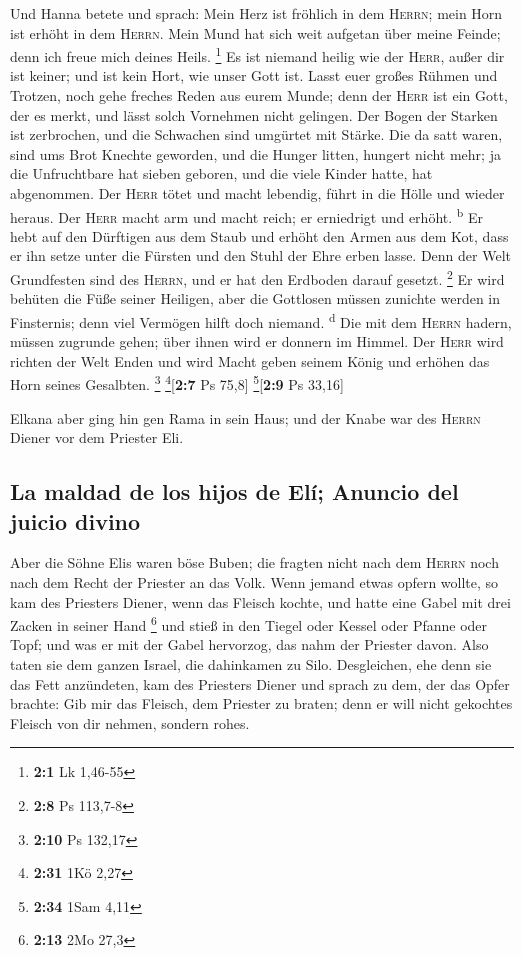  Und Hanna betete und sprach: Mein Herz ist fröhlich in
dem \textsc{Herrn}; mein Horn ist erhöht in dem \textsc{Herrn}. Mein
Mund hat sich weit aufgetan über meine Feinde; denn ich freue mich
deines Heils. \footnote{\textbf{2:1} Lk 1,46-55}  Es ist
niemand heilig wie der \textsc{Herr}, außer dir ist keiner; und ist kein
Hort, wie unser Gott ist.  Lasst euer großes Rühmen und
Trotzen, noch gehe freches Reden aus eurem Munde; denn der \textsc{Herr}
ist ein Gott, der es merkt, und lässt solch Vornehmen nicht gelingen.
 Der Bogen der Starken ist zerbrochen, und die Schwachen
sind umgürtet mit Stärke.  Die da satt waren, sind ums
Brot Knechte geworden, und die Hunger litten, hungert nicht mehr; ja die
Unfruchtbare hat sieben geboren, und die viele Kinder hatte, hat
abgenommen.  Der \textsc{Herr} tötet und macht lebendig,
führt in die Hölle und wieder heraus.  Der \textsc{Herr}
macht arm und macht reich; er erniedrigt und erhöht. \textsuperscript{b}
 Er hebt auf den Dürftigen aus dem Staub und erhöht den
Armen aus dem Kot, dass er ihn setze unter die Fürsten und den Stuhl der
Ehre erben lasse. Denn der Welt Grundfesten sind des \textsc{Herrn}, und
er hat den Erdboden darauf gesetzt. \footnote{\textbf{2:8} Ps 113,7-8}
 Er wird behüten die Füße seiner Heiligen, aber die
Gottlosen müssen zunichte werden in Finsternis; denn viel Vermögen hilft
doch niemand. \textsuperscript{d}  Die mit dem
\textsc{Herrn} hadern, müssen zugrunde gehen; über ihnen wird er donnern
im Himmel. Der \textsc{Herr} wird richten der Welt Enden und wird Macht
geben seinem König und erhöhen das Horn seines Gesalbten. \footnote{\textbf{2:10}
  Ps 132,17} \footnote{\textbf{2:31} 1Kö 2,27}{[}\textbf{2:7} Ps 75,8{]}
\footnote{\textbf{2:34} 1Sam 4,11}{[}\textbf{2:9} Ps 33,16{]}

 Elkana aber ging hin gen Rama in sein Haus; und der
Knabe war des \textsc{Herrn} Diener vor dem Priester Eli.

\hypertarget{la-maldad-de-los-hijos-de-eluxed-anuncio-del-juicio-divino}{%
\subsection{La maldad de los hijos de Elí; Anuncio del juicio
divino}\label{la-maldad-de-los-hijos-de-eluxed-anuncio-del-juicio-divino}}

 Aber die Söhne Elis waren böse Buben; die fragten nicht
nach dem \textsc{Herrn}  noch nach dem Recht der Priester
an das Volk. Wenn jemand etwas opfern wollte, so kam des Priesters
Diener, wenn das Fleisch kochte, und hatte eine Gabel mit drei Zacken in
seiner Hand \footnote{\textbf{2:13} 2Mo 27,3}  und stieß
in den Tiegel oder Kessel oder Pfanne oder Topf; und was er mit der
Gabel hervorzog, das nahm der Priester davon. Also taten sie dem ganzen
Israel, die dahinkamen zu Silo.  Desgleichen, ehe denn
sie das Fett anzündeten, kam des Priesters Diener und sprach zu dem, der
das Opfer brachte: Gib mir das Fleisch, dem Priester zu braten; denn er
will nicht gekochtes Fleisch von dir nehmen, sondern rohes.

